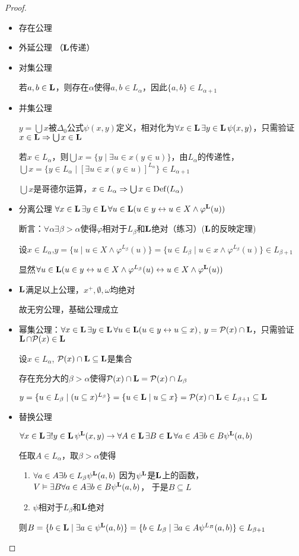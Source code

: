 \documentclass[11pt]{article}
\begin{document}
\begin{proof}
\begin{itemize}
\item 存在公理
\item 外延公理 （\(\operatorname{\textbf{L}}\)传递）
\item 对集公理

若\(a,b\in\operatorname{\textbf{L}}\)，则存在\(\alpha\)使得\(a,b\in L_\alpha\)，因此\(\{a,b\}\in L_{\alpha+1}\)
\item 并集公理

\(y=\bigcup x\)被\(\Delta_0\)公式\(\psi(x,y)\)定义，相对化为\(\forall x\in\operatorname{\textbf{L}}\exists y\in\operatorname{\textbf{L}}\psi(x,y)\)，只需验证\(x\in\operatorname{\textbf{L}}\Rightarrow\bigcup x\in\operatorname{\textbf{L}}\)

若\(x\in L_\alpha\)，则\(\bigcup x=\{y\mid\exists u\in x(y\in u)\}\)，由\(L_\alpha\)的传递性，
\(\bigcup x=\{y\in L_\alpha\mid[\exists u\in x(y\in u)]^{L_\alpha}\}\in L_{\alpha+1}\)

\(\bigcup x\)是哥德尔运算，\(x\in L_\alpha\Rightarrow\bigcup x\in\operatorname{Def}(L_\alpha)\)
\item 分离公理 \(\forall x\in\operatorname{\textbf{L}}\exists y\in\operatorname{\textbf{L}}\forall u\in\operatorname{\textbf{L}}(u\in y\leftrightarrow u\in X\wedge\varphi^{\operatorname{\textbf{L}}}(u))\)

断言：\(\forall\alpha\exists\beta>\alpha\)使得\(\varphi\)相对于\(L_\beta\)和\(\operatorname{\textbf{L}}\)绝对（练习）(\(\operatorname{\textbf{L}}\)的反映定理)

设\(x\in L_\alpha\),\(y=\{u\mid u\in X\wedge\varphi^{L_\beta}(u)\}=\{u\in L_\beta\mid u\in x\wedge\varphi^{L_\beta}(u)\}\in L_{\beta+1}\)

显然\(\forall u\in\operatorname{\textbf{L}}(u\in y\leftrightarrow u\in X\wedge\varphi^{L_\beta}(u)\leftrightarrow u\in X\wedge\varphi^{\operatorname{\textbf{L}}}(u))\)
\item \(\operatorname{\textbf{L}}\)满足以上公理，\(x^+,\emptyset,\omega\)均绝对

故无穷公理，基础公理成立
\item 幂集公理：\(\forall x\in\operatorname{\textbf{L}}\exists y\in\operatorname{\textbf{L}}\forall u\in\operatorname{\textbf{L}}(u\in y\leftrightarrow u\subseteq x)\), \(y=\mathcal{P}(x)\cap\operatorname{\textbf{L}}\)，只需验证\(\operatorname{\textbf{L}}\cap\mathcal{P}(x)\in\operatorname{\textbf{L}}\)

设\(x\in L_\alpha\), \(\mathcal{P}(x)\cap\operatorname{\textbf{L}}\subseteq\operatorname{\textbf{L}}\)是集合

存在充分大的\(\beta>\alpha\)使得\(\mathcal{P}(x)\cap\operatorname{\textbf{L}}=\mathcal{P}(x)\cap L_\beta\)

\(y=\{u\in L_\beta\mid(u\subseteq x)^{L_\beta}\}=\{u\in\operatorname{\textbf{L}}\mid u\subseteq x\}=\mathcal{P}(x)\cap\operatorname{\textbf{L}}\in L_{\beta+1}\subseteq\operatorname{\textbf{L}}\)
\item 替换公理

\(\forall x\in\operatorname{\textbf{L}}\exists!y\in\operatorname{\textbf{L}}\psi^{\operatorname{\textbf{L}}}(x,y)\to\forall A\in\operatorname{\textbf{L}}\exists B\in\operatorname{\textbf{L}}\forall a\in A\exists b\in B\psi^{\operatorname{\textbf{L}}}(a,b)\)

任取\(A\in L_\alpha\)，取\(\beta>\alpha\)使得
\begin{enumerate}
\item \(\forall a\in A\exists b\in L_\beta\psi^{\operatorname{\textbf{L}}}(a,b)\) 因为\(\psi^{\operatorname{\textbf{L}}}\)是\(\operatorname{\textbf{L}}\)上的函数，\(V\vDash\exists B\forall a\in A\exists b\in B\psi^{\operatorname{\textbf{L}}}(a,b)\)，
于是\(B\subseteq L\)
\item \(\psi\)相对于\(L_\beta\)和\(\operatorname{\textbf{L}}\)绝对
\end{enumerate}
则\(B=\{b\in\operatorname{\textbf{L}}\mid\exists a\in\psi^{\operatorname{\textbf{L}}}(a,b)\}=\{b\in L_\beta\mid\exists a\in A\psi^{L_B}(a,b)\}\in L_{\beta+1}\)
\end{itemize}
\end{proof}
\end{document}
